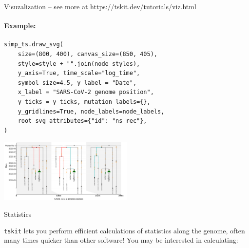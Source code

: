 \documentclass[landscape,a0paper,fontscale=0.4]{baposter}
\newcommand{\tskit}{{\texttt{tskit}}}
\begin{document}
\begin{poster}
\begin{posterbox}[name=viz,column=1,row=0,span=2,below=overview]{Visuzalization -- \textup{see more at \url{https://tskit.dev/tutorials/viz.html}}}
\begin{multicols}{2}

\columnbreak
\paragraph{Example:}
\begin{verbatim}
simp_ts.draw_svg(
    size=(800, 400), canvas_size=(850, 405),
    style=style + "".join(node_styles),
    y_axis=True, time_scale="log_time",
    symbol_size=4.5, y_label = "Date",
    x_label = "SARS-CoV-2 genome position",
    y_ticks = y_ticks, mutation_labels={},
    y_gridlines=True, node_labels=node_labels,
    root_svg_attributes={"id": "ns_rec"},
)
\end{verbatim}

\includegraphics[width=0.5\textwidth]{Covid_recombination}

\end{multicols}

\end{posterbox}



\begin{posterbox}[name=stats,column=3,row=0,span=1]{Statistics}

\tskit{} lets you perform efficient calculations of statistics along the genome, often many times quicker than other software! You may be interested in calculating:


\end{posterbox}
\end{poster}
\end{document}
